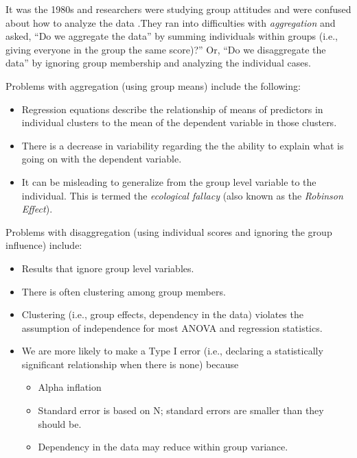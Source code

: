 \documentclass[
  11pt,
]{book}
\providecommand{\tightlist}{%
  \setlength{\itemsep}{0pt}\setlength{\parskip}{0pt}}
\begin{document}
It was the 1980s and researchers were studying group attitudes and were confused about how to analyze the data \citep{singer_applied_2003}.They ran into difficulties with \emph{aggregation} and asked, ``Do we aggregate the data'' by summing individuals within groups (i.e., giving everyone in the group the same score)?'' Or, ``Do we disaggregate the data'' by ignoring group membership and analyzing the individual cases.

Problems with aggregation (using group means) include the following:

\begin{itemize}
\tightlist
\item
  Regression equations describe the relationship of means of predictors in individual clusters to the mean of the dependent variable in those clusters.
\item
  There is a decrease in variability regarding the the ability to explain what is going on with the dependent variable.
\item
  It can be misleading to generalize from the group level variable to the individual. This is termed the \emph{ecological fallacy} (also known as the \emph{Robinson Effect}).
\end{itemize}

Problems with disaggregation (using individual scores and ignoring the group influence) include:

\begin{itemize}
\tightlist
\item
  Results that ignore group level variables.
\item
  There is often clustering among group members.
\item
  Clustering (i.e., group effects, dependency in the data) violates the assumption of independence for most ANOVA and regression statistics.
\item
  We are more likely to make a Type I error (i.e., declaring a statistically significant relationship when there is none) because

  \begin{itemize}
  \tightlist
  \item
    Alpha inflation
  \item
    Standard error is based on N; standard errors are smaller than they should be.
  \item
    Dependency in the data may reduce within group variance.
  \end{itemize}
\end{itemize}
\end{document}
